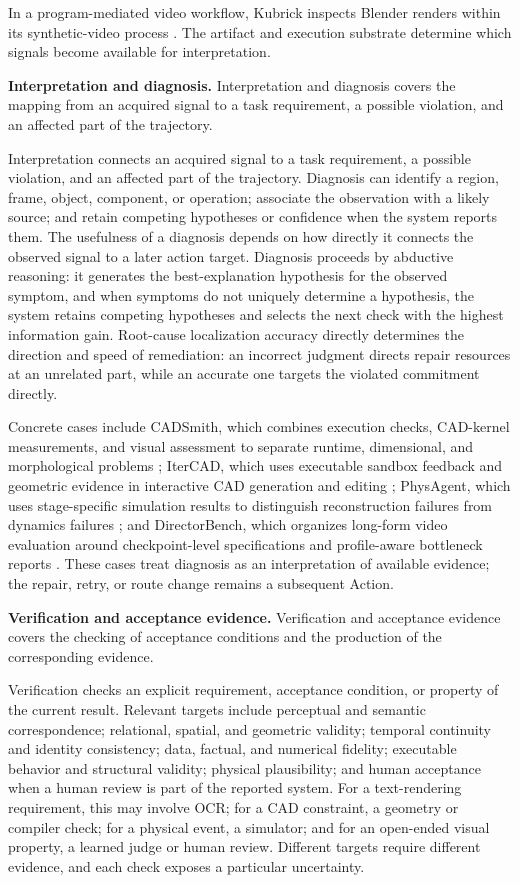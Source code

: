 In a program-mediated video workflow, Kubrick inspects Blender renders within its synthetic-video process \cite{he2024kubrick}. The artifact and execution substrate determine which signals become available for interpretation.

\textbf{Interpretation and diagnosis.} Interpretation and diagnosis covers the mapping from an acquired signal to a task requirement, a possible violation, and an affected part of the trajectory.

Interpretation connects an acquired signal to a task requirement, a possible violation, and an affected part of the trajectory. Diagnosis can identify a region, frame, object, component, or operation; associate the observation with a likely source; and retain competing hypotheses or confidence when the system reports them. The usefulness of a diagnosis depends on how directly it connects the observed signal to a later action target. Diagnosis proceeds by abductive reasoning: it generates the best-explanation hypothesis for the observed symptom, and when symptoms do not uniquely determine a hypothesis, the system retains competing hypotheses and selects the next check with the highest information gain. Root-cause localization accuracy directly determines the direction and speed of remediation: an incorrect judgment directs repair resources at an unrelated part, while an accurate one targets the violated commitment directly.

Concrete cases include CADSmith, which combines execution checks, CAD-kernel measurements, and visual assessment to separate runtime, dimensional, and morphological problems \cite{barkley2026cadsmith}; IterCAD, which uses executable sandbox feedback and geometric evidence in interactive CAD generation and editing \cite{hu2026itercad}; PhysAgent, which uses stage-specific simulation results to distinguish reconstruction failures from dynamics failures \cite{li2026physagent}; and DirectorBench, which organizes long-form video evaluation around checkpoint-level specifications and profile-aware bottleneck reports \cite{avg260530090}. These cases treat diagnosis as an interpretation of available evidence; the repair, retry, or route change remains a subsequent Action.

\textbf{Verification and acceptance evidence.} Verification and acceptance evidence covers the checking of acceptance conditions and the production of the corresponding evidence.

Verification checks an explicit requirement, acceptance condition, or property of the current result. Relevant targets include perceptual and semantic correspondence; relational, spatial, and geometric validity; temporal continuity and identity consistency; data, factual, and numerical fidelity; executable behavior and structural validity; physical plausibility; and human acceptance when a human review is part of the reported system. For a text-rendering requirement, this may involve OCR; for a CAD constraint, a geometry or compiler check; for a physical event, a simulator; and for an open-ended visual property, a learned judge or human review. Different targets require different evidence, and each check exposes a particular uncertainty.


